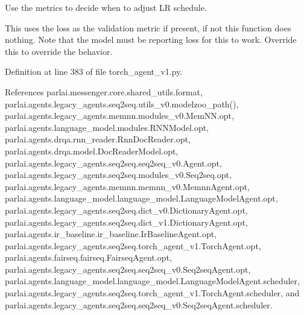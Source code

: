 \begin{DoxyVerb}Use the metrics to decide when to adjust LR schedule.

This uses the loss as the validation metric if present, if not this
function does nothing. Note that the model must be reporting loss for
this to work.
Override this to override the behavior.
\end{DoxyVerb}
 

Definition at line 383 of file torch\+\_\+agent\+\_\+v1.\+py.



References parlai.\+messenger.\+core.\+shared\+\_\+utils.\+format, parlai.\+agents.\+legacy\+\_\+agents.\+seq2seq.\+utils\+\_\+v0.\+modelzoo\+\_\+path(), parlai.\+agents.\+legacy\+\_\+agents.\+memnn.\+modules\+\_\+v0.\+Mem\+N\+N.\+opt, parlai.\+agents.\+language\+\_\+model.\+modules.\+R\+N\+N\+Model.\+opt, parlai.\+agents.\+drqa.\+rnn\+\_\+reader.\+Rnn\+Doc\+Reader.\+opt, parlai.\+agents.\+drqa.\+model.\+Doc\+Reader\+Model.\+opt, parlai.\+agents.\+legacy\+\_\+agents.\+seq2seq.\+seq2seq\+\_\+v0.\+Agent.\+opt, parlai.\+agents.\+legacy\+\_\+agents.\+seq2seq.\+modules\+\_\+v0.\+Seq2seq.\+opt, parlai.\+agents.\+legacy\+\_\+agents.\+memnn.\+memnn\+\_\+v0.\+Memnn\+Agent.\+opt, parlai.\+agents.\+language\+\_\+model.\+language\+\_\+model.\+Language\+Model\+Agent.\+opt, parlai.\+agents.\+legacy\+\_\+agents.\+seq2seq.\+dict\+\_\+v0.\+Dictionary\+Agent.\+opt, parlai.\+agents.\+legacy\+\_\+agents.\+seq2seq.\+dict\+\_\+v1.\+Dictionary\+Agent.\+opt, parlai.\+agents.\+ir\+\_\+baseline.\+ir\+\_\+baseline.\+Ir\+Baseline\+Agent.\+opt, parlai.\+agents.\+legacy\+\_\+agents.\+seq2seq.\+torch\+\_\+agent\+\_\+v1.\+Torch\+Agent.\+opt, parlai.\+agents.\+fairseq.\+fairseq.\+Fairseq\+Agent.\+opt, parlai.\+agents.\+legacy\+\_\+agents.\+seq2seq.\+seq2seq\+\_\+v0.\+Seq2seq\+Agent.\+opt, parlai.\+agents.\+language\+\_\+model.\+language\+\_\+model.\+Language\+Model\+Agent.\+scheduler, parlai.\+agents.\+legacy\+\_\+agents.\+seq2seq.\+torch\+\_\+agent\+\_\+v1.\+Torch\+Agent.\+scheduler, and parlai.\+agents.\+legacy\+\_\+agents.\+seq2seq.\+seq2seq\+\_\+v0.\+Seq2seq\+Agent.\+scheduler.

